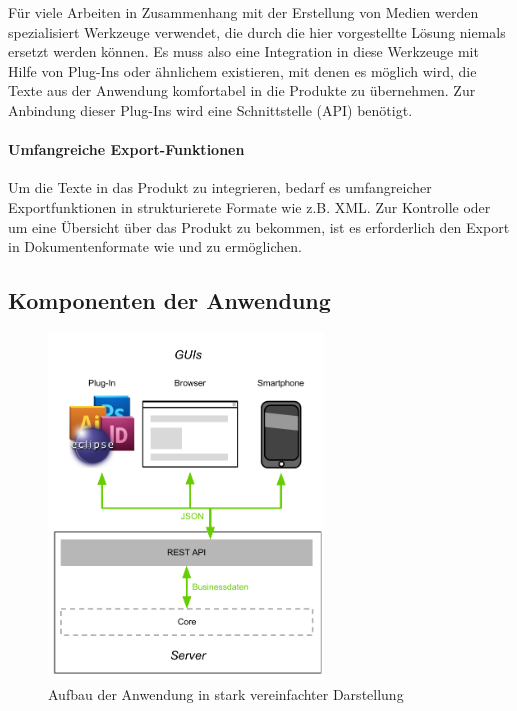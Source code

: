 Für viele Arbeiten in Zusammenhang mit der Erstellung von Medien werden spezialisiert Werkzeuge verwendet, die durch die hier vorgestellte Lösung niemals ersetzt werden können. Es muss also eine Integration in diese Werkzeuge mit Hilfe von Plug-Ins oder ähnlichem existieren, mit denen es möglich wird, die Texte aus der Anwendung komfortabel in die Produkte zu übernehmen. Zur Anbindung dieser Plug-Ins wird eine Schnittstelle (API) benötigt.

\paragraph{Umfangreiche Export-Funktionen}

Um die Texte in das Produkt zu integrieren, bedarf es umfangreicher Exportfunktionen in strukturierete Formate wie z.B. XML. Zur Kontrolle oder um eine Übersicht über das Produkt zu bekommen, ist es erforderlich den Export in Dokumentenformate wie  und  zu ermöglichen.

\pagebreak

\subsection{Komponenten der Anwendung}\label{l:loesungsart}

\begin{figure}[htb]
\begin{center}
\includegraphics[width=0.65\textwidth]{media/ArtdesSystems.pdf}
\caption{Aufbau der Anwendung in stark vereinfachter Darstellung}
\label{chart:aufbaudessystems}
\end{center}
\end{figure}

